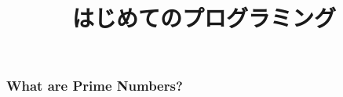 \documentclass[lualatex,ja=standard]{beamer}
\title{はじめてのプログラミング}
\begin{document}
\begin{frame}
\titlepage
\end{frame}
\begin{frame}
\frametitle{What are Prime Numbers?}
\end{frame}
\end{document}
